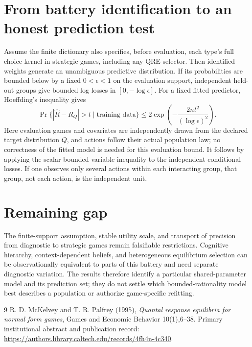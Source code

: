 \documentclass[11pt]{article}
\theoremstyle{definition}
\begin{document}
\section*{From battery identification to an honest prediction test}
Assume the finite dictionary also specifies, before evaluation, each
type's full choice kernel in strategic games, including any QRE selector.
Then identified weights generate an unambiguous predictive distribution.
If its probabilities are bounded below by a fixed $0<\epsilon<1$ on the
evaluation support, independent held-out groups give bounded log losses
in $[0,-\log\epsilon]$. For a fixed fitted predictor, Hoeffding's
inequality gives
\[
 \Pr\{|\widehat R-R_Q|>t\mid\text{training data}\}
 \le2\exp\!\left(-\frac{2nt^2}{(\log\epsilon)^2}\right).  \tag{3}
\]
Here evaluation games and covariates are independently drawn from the
declared target distribution $Q$, and actions follow their actual
population law; no correctness of the fitted model is needed for this
evaluation bound. It follows by applying the scalar bounded-variable
inequality to the independent conditional losses. If one observes only
several actions within each interacting group, that group, not each action,
is the independent unit.

\section*{Remaining gap}
The finite-support assumption, stable utility scale, and transport of
precision from diagnostic to strategic games remain falsifiable
restrictions. Cognitive hierarchy, context-dependent beliefs, and
heterogeneous equilibrium selection can be observationally equivalent
to parts of this battery and need separate diagnostic variation. The
results therefore identify a particular shared-parameter model and its
prediction set; they do not settle which bounded-rationality model best
describes a population or authorize game-specific refitting.
\begin{thebibliography}{9}
 R. D. McKelvey and T. R. Palfrey (1995), \emph{Quantal
response equilibria for normal form games}, Games and Economic Behavior
10(1),6--38. Primary institutional abstract and publication record:
\url{https://authors.library.caltech.edu/records/4fh4n-4c340}.
\end{thebibliography}
\end{document}
